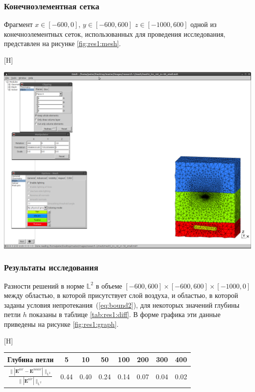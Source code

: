 \documentclass[a4paper,14pt]{article}
\makeatletter
\renewenvironment{figure}[1][\fps@figure]{
  \edef\@tempa{\noexpand\@float{figure}[#1]}
  \@tempa
  \addtocounter{foofigure}{1}
}{
  \end@float
}
\renewenvironment{table}[1][\fps@table]{
  \edef\@tempa{\noexpand\@float{table}[#1]}
  \@tempa
  \addtocounter{footable}{1}
}{
  \end@float
}
\makeatother
\begin{document}
\subsubsection{Конечноэлементная сетка}
Фрагмент $x \in [-600,0]$, $y \in [-600,600]$ $z \in [-1000,600]$ одной из конечноэлементных сеток, использованных для проведения исследования, представлен на рисунке \ref{fig:res1:mesh}.

\begin{figure}[H]
	\centering
	\includegraphics[trim=390mm 20mm 5mm 195mm,clip,scale=0.5]{research-1/mesh/mesh.png}
	\caption{фрагмент конечноэлементной сетки}
	\label{fig:res1:mesh}
\end{figure}

\subsubsection{Результаты исследования}
Разности решений в норме $\mathbb{L}^2$ в объеме $[-600,600] \times [-600,600] \times [-1000,0]$ между областью, в которой присутствует слой воздуха, и областью, в которой заданы условия непротекания~(\ref{eq:bound2}), для некоторых значений глубины петли $h$ показаны в таблице \ref{tab:res1:diff}. В форме графика эти данные приведены на рисунке \ref{fig:res1:graph}.

\begin{table}[H]
	\caption{относительные разности решений}
	\label{tab:res1:diff}
	\begin{tabularx}{\textwidth}{|C{2.4}|C{0.8}|C{0.8}|C{0.8}|C{0.8}|C{0.8}|C{0.8}|C{0.8}|}
		\hline Глубина петли & 5 & 10 & 50 & 100 & 200 & 300 & 400 \\
		\hline $\displaystyle \frac{\| | \mathbf{E}^{air} - \mathbf{E}^{noair} | \|_{\mathbb{L}^2}}{\| | \mathbf{E}^{air} | \|_{\mathbb{L}^2}}$ & 0.44 & 0.40 & 0.24 & 0.14 & 0.07 & 0.04 & 0.02 \\
		\hline
	\end{tabularx}
\end{table}
\end{document}

